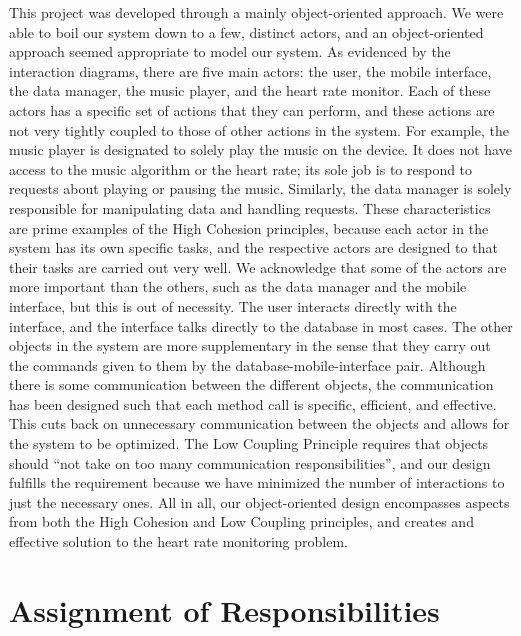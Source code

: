 \documentclass[letterpaper,english, 12pt]{scrreprt}
\begin{document}
This project was developed through a mainly object-oriented approach. We were able to boil our system down to a few, distinct actors, and an object-oriented approach seemed appropriate to model our system. As evidenced by the interaction diagrams, there are five main actors: the user, the mobile interface, the data manager, the music player, and the heart rate monitor. Each of these actors has a specific set of actions that they can perform, and these actions are not very tightly coupled to those of other actions in the system. For example, the music player is designated to solely play the music on the device. It does not have access to the music algorithm or the heart rate; its sole job is to respond to requests about playing or pausing the music. Similarly, the data manager is solely responsible for manipulating data and handling requests. These characteristics are prime examples of the High Cohesion principles, because each actor in the system has its own specific tasks, and the respective actors are designed to that their tasks are carried out very well. We acknowledge that some of the actors are more important than the others, such as the data manager and the mobile interface, but this is out of necessity. The user interacts directly with the interface, and the interface talks directly to the database in most cases. The other objects in the system are more supplementary in the sense that they carry out the commands given to them by the database-mobile-interface pair. Although there is some communication between the different objects, the communication has been designed such that each method call is specific, efficient, and effective. This cuts back on unnecessary communication between the objects and allows for the system to be optimized. The Low Coupling Principle requires that objects should ``not take on too many communication responsibilities'', and our design fulfills the requirement because we have minimized the number of interactions to just the necessary ones. All in all, our object-oriented design encompasses aspects from both the High Cohesion and Low Coupling principles, and creates and effective solution to the heart rate monitoring problem.

\section{Assignment of Responsibilities}
\end{document}
